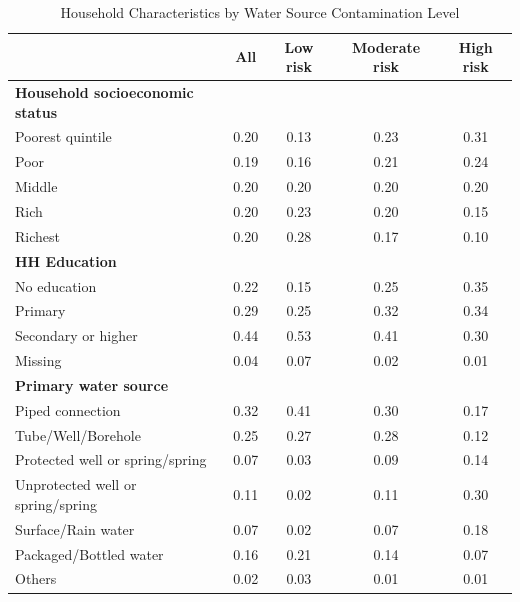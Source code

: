 \begin{table}[htbp]\centering
\def\sym#1{\ifmmode^{#1}\else\(^{#1}\)\fi}
\caption{Household Characteristics by Water Source Contamination Level \label{Desc1}}
\begin{tabular}{l*{4}{c}}
\hline\hline
                    &\multicolumn{1}{c}{All}&\multicolumn{1}{c}{Low risk}&\multicolumn{1}{c}{Moderate risk}&\multicolumn{1}{c}{High risk}\\

\hline
\textbf{Household socioeconomic status} \\\hline Poorest quintile             &        0.20&        0.13&        0.23&        0.31\\
Poor                &        0.19&        0.16&        0.21&        0.24\\
Middle              &        0.20&        0.20&        0.20&        0.20\\
Rich                &        0.20&        0.23&        0.20&        0.15\\
Richest             &        0.20&        0.28&        0.17&        0.10\\
\textbf{HH Education} \\\hline No education        &        0.22&        0.15&        0.25&        0.35\\
Primary             &        0.29&        0.25&        0.32&        0.34\\
Secondary or higher &        0.44&        0.53&        0.41&        0.30\\
Missing             &        0.04&        0.07&        0.02&        0.01\\
\textbf{Primary water source} \\\hline Piped connection         &        0.32&        0.41&        0.30&        0.17\\
Tube/Well/Borehole  &        0.25&        0.27&        0.28&        0.12\\
Protected well or spring/spring&        0.07&        0.03&        0.09&        0.14\\
Unprotected well or spring/spring&        0.11&        0.02&        0.11&        0.30\\
Surface/Rain water  &        0.07&        0.02&        0.07&        0.18\\
Packaged/Bottled water&        0.16&        0.21&        0.14&        0.07\\
Others              &        0.02&        0.03&        0.01&        0.01\\

\end{tabular}
\end{table}
